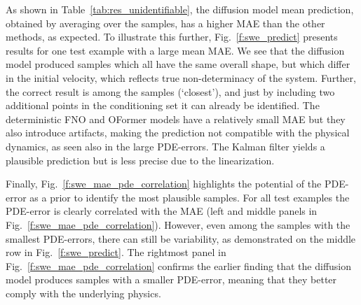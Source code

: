 \documentclass{article}
\begin{document}
As shown in Table~\ref{tab:res_unidentifiable}, the diffusion model mean prediction, obtained by averaging over the samples, has a higher MAE than the other methods, as expected. To illustrate this further, Fig.~\ref{f:swe_predict} presents results for one test example with a large mean MAE. We see that the diffusion model produced samples which all have the same overall shape, but which differ in the initial velocity, which reflects true non-determinacy of the system. Further, the correct result is among the samples (`closest'), and just by including two additional points in the conditioning set it can already be identified. The deterministic FNO and OFormer models have a relatively small MAE but they also introduce artifacts, making the prediction not compatible with the physical dynamics, as seen also in the large PDE-errors. The Kalman filter yields a plausible prediction but is less precise due to the linearization. 

Finally, Fig.~\ref{f:swe_mae_pde_correlation} highlights the potential of the PDE-error as a prior to identify the most plausible samples. For all test examples the PDE-error is clearly correlated with the MAE (left and middle panels in Fig.~\ref{f:swe_mae_pde_correlation}). However, even among the samples with the smallest PDE-errors, there can still be variability, as demonstrated on the middle row in Fig.~\ref{f:swe_predict}. The rightmost panel in Fig.~\ref{f:swe_mae_pde_correlation} confirms the earlier finding that the diffusion model produces samples with a smaller PDE-error, meaning that they better comply with the underlying physics.
\end{document}
